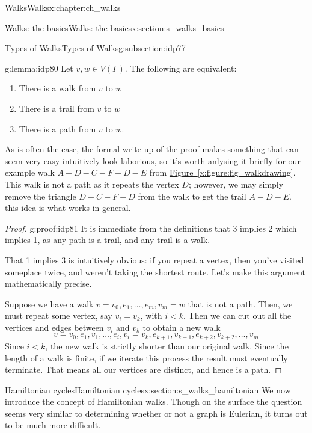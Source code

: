 \documentclass[oneside,10pt,]{book}
\newcommand{\xreffont}{\relax}
\numberwithin{equation}{section}
\newcommand{\lt}{<}
\begin{document}
\begin{chapterptx}{Walks}{}{Walks}{}{}{x:chapter:ch_walks}
\begin{sectionptx}{Walks: the basics}{}{Walks: the basics}{}{}{x:section:s_walks_basics}
\begin{subsectionptx}{Types of Walks}{}{Types of Walks}{}{}{g:subsection:idp77}
\begin{lemma}{}{}{g:lemma:idp80}
Let \(v,w\in V(\Gamma)\).  The following are equivalent:%
%
\begin{enumerate}
\item{}There is a walk from \(v\) to \(w\)%
\item{}There is a trail from \(v\) to \(w\)%
\item{}There is a path from \(v\) to \(w\).%
\end{enumerate}
\end{lemma}
As is often the case, the formal write-up of the proof makes something that can seem very easy intuitively look laborious, so it's worth anlysing it briefly for our example walk \(A-D-C-F-D-E\) from \hyperref[x:figure:fig_walkdrawing]{Figure~{\xreffont\ref{x:figure:fig_walkdrawing}}}.  This walk is not a path as it repeats the vertex \(D\); however, we may simply remove the triangle \(D-C-F-D\) from the walk to get the trail \(A-D-E\).  this idea is what works in general.%
\begin{proof}{}{g:proof:idp81}
It is immediate from the definitions that 3 implies 2 which implies 1, as any path is a trail, and any trail is a walk.%
\par
That 1 implies 3 is intuitively obvious: if you repeat a vertex, then you've visited someplace twice, and weren't taking the shortest route.  Let's make this argument mathematically precise.%
\par
Suppose we have a walk \(v=v_0,e_1,\dots, e_m, v_m=w\) that is not a path.  Then, we must repeat some vertex, say \(v_i=v_k\), with \(i\lt k\).  Then we can cut out all the vertices and edges between \(v_i\) and \(v_k\) to obtain a new walk%
%
\begin{equation*}
v=v_0,e_1, v_1,\dots, e_i, v_i=v_k, e_{k+1}, v_{k+1}, e_{k+2}, v_{k+2}, \dots, v_m
\end{equation*}
Since \(i \lt k \), the new walk is strictly shorter than our original walk.  Since the length of a walk is finite, if we iterate this process the result must eventually terminate.  That means all our vertices are distinct, and hence is a path.%
\end{proof}
\end{subsectionptx}
\end{sectionptx}
%
%
\typeout{************************************************}
\typeout{************************************************}
%
\begin{sectionptx}{Hamiltonian cycles}{}{Hamiltonian cycles}{}{}{x:section:s_walks_hamiltonian}
We now introduce the concept of Hamiltonian walks. Though on the surface the question seems very similar to determining whether or not a graph is Eulerian, it turns out to be much more difficult.%

\end{sectionptx}
\end{chapterptx}
\end{document}

